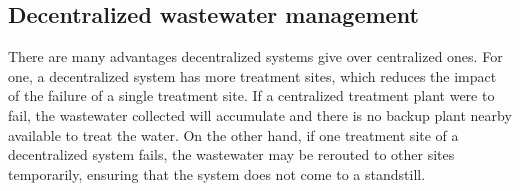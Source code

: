 \documentclass[preprint,12pt,authoryear]{elsarticle}
\begin{document}


\subsection{Decentralized wastewater management}
There are many advantages decentralized systems give over centralized ones. For one, a decentralized system has more treatment sites, which reduces the impact of the failure of a single treatment site. If a centralized treatment plant were to fail, the wastewater collected will accumulate and there is no backup plant nearby available to treat the water. On the other hand, if one treatment site of a decentralized system fails, the wastewater may be rerouted to other sites temporarily, ensuring that the system does not come to a standstill. 
\end{document}
